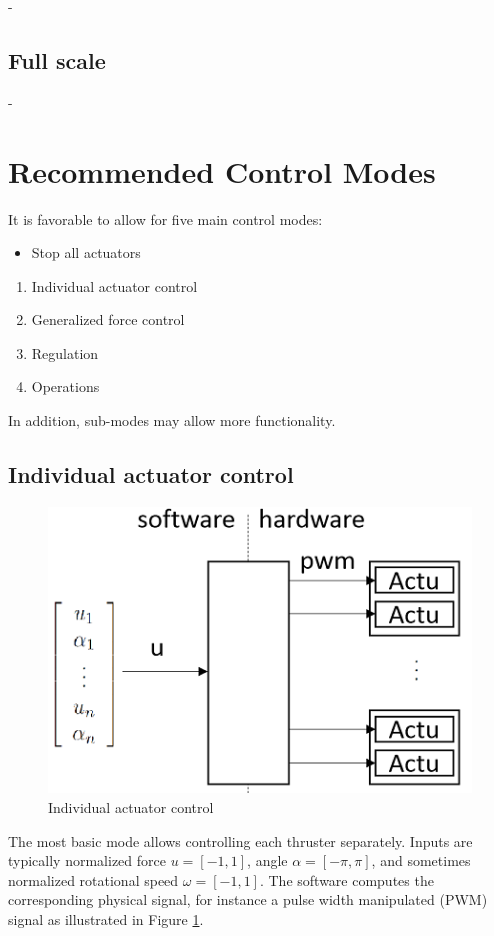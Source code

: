 \documentclass[a4paper,twoside,english]{report}
\begin{document}
-

\subsection{Full scale}

-

\clearpage{}

\section{Recommended Control Modes}

It is favorable to allow for five main control modes:
\begin{itemize}
\item Stop all actuators
\end{itemize}
\begin{enumerate}
\item Individual actuator control
\item Generalized force control
\item Regulation
\item Operations
\end{enumerate}
In addition, sub-modes may allow more functionality. 

\subsection{Individual actuator control}

\begin{figure}
\centering \includegraphics[scale=0.45]{fig/ctrl_u} \caption{\label{fig: Individual actuator control}Individual actuator control}
\end{figure}

The most basic mode allows controlling each thruster separately. Inputs
are typically normalized force $u=\left[-1,1\right]$, angle $\alpha=\left[-\pi,\pi\right]$,
and sometimes normalized rotational speed $\omega=\left[-1,1\right]$.
The software computes the corresponding physical signal, for instance
a pulse width manipulated (PWM) signal as illustrated in Figure \ref{fig: Individual actuator control}.
\end{document}
